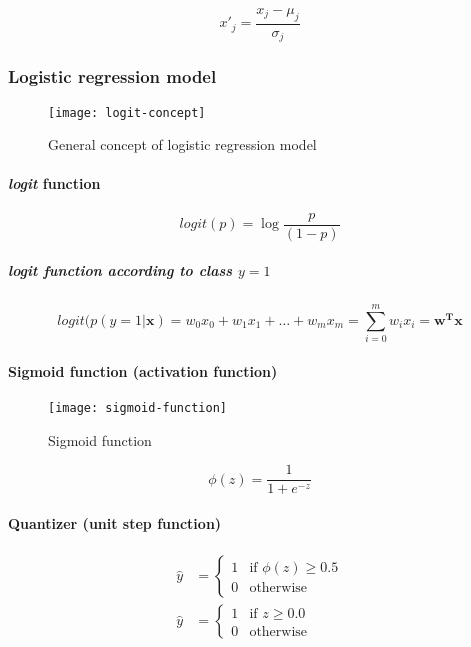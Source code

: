 \documentclass{article}
\begin{document}
			\begin{equation}
				x'_j = \frac{x_j - \mu_j}{\sigma_j}
			\end{equation}
			
			\subsubsection{Logistic regression model}

			\begin{figure}
				\centering
				\texttt{[image: logit-concept]}
				\caption{General concept of logistic regression model}
				\label{fig:logit-concept}
			\end{figure}
			
			\paragraph{\textit{logit} function}
			
			\begin{equation}
				logit(p) = \log \frac{p}{(1-p)}
			\end{equation}
			
			\subparagraph{\textit{logit} function according to class $y = 1$}
			
			\begin{equation}
				logit(p(y=1|\boldsymbol{x}) = w_0 x_0 + w_1 x_1 + \dots + w_m x_m = \sum_{i=0}^m w_i x_i = \boldsymbol{w^T x}
			\end{equation}
			
			\paragraph{Sigmoid function (activation function)}

			\begin{figure}
				\centering
				\texttt{[image: sigmoid-function]}
				\caption{Sigmoid function}
				\label{fig:sigmoid-function}
			\end{figure}
			
			\begin{equation}
				\phi(z) = \frac{1}{1+e^{-z}}
			\end{equation}
			
			\paragraph{Quantizer (unit step function)}
			
			\begin{equation}
				\begin{aligned}
					\hat{y} &= \begin{cases} 1 &\mbox{if } \phi(z) \geq 0.5 \\ 0 &\mbox{otherwise} \end{cases} \\
					\hat{y} &= \begin{cases} 1 &\mbox{if } z \geq 0.0 \\ 0 &\mbox{otherwise} \end{cases}
				\end{aligned}
			\end{equation}
					
\end{document}
